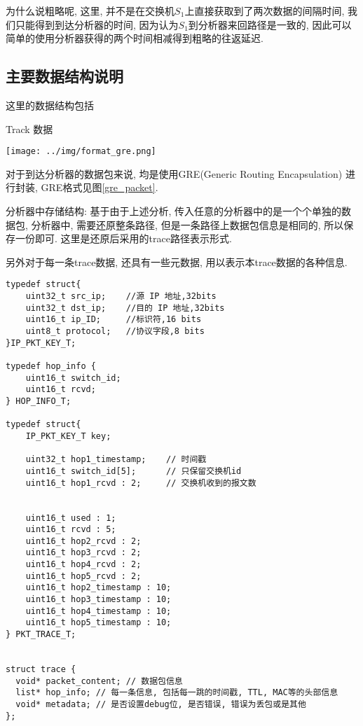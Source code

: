 {\begin{mdframed}[everyline=true]
为什么说粗略呢, 这里,
并不是在交换机\(S_{1}\)上直接获取到了两次数据的间隔时间,
我们只能得到到达分析器的时间, 因为认为\(S_{1}\)到分析器来回路径是一致的,
因此可以 简单的使用分析器获得的两个时间相减得到粗略的往返延迟.

\subsection{主要数据结构说明}

这里的数据结构包括

Track 数据

\begin{center}
\texttt{[image: ../img/format\_gre.png]}
\label{gre_packet}
\end{center}

对于到达分析器的数据包来说, 均是使用GRE(Generic Routing Encapsulation)
进行封装, GRE格式见图\ref{gre_packet}.

分析器中存储结构: 基于由于上述分析,
传入任意的分析器中的是一个个单独的数据包, 分析器中, 需要还原整条路径,
但是一条路径上数据包信息是相同的, 所以保存一份即可.
这里是还原后采用的trace路径表示形式.

另外对于每一条trace数据, 还具有一些元数据,
用以表示本trace数据的各种信息.

\begin{lstlisting}
typedef struct{
    uint32_t src_ip;    //源 IP 地址,32bits
    uint32_t dst_ip;    //目的 IP 地址,32bits
    uint16_t ip_ID;     //标识符,16 bits
    uint8_t protocol;   //协议字段,8 bits
}IP_PKT_KEY_T;

typedef hop_info {
    uint16_t switch_id;
    uint16_t rcvd;
} HOP_INFO_T;

typedef struct{
    IP_PKT_KEY_T key;

    uint32_t hop1_timestamp;    // 时间戳
    uint16_t switch_id[5];      // 只保留交换机id
    uint16_t hop1_rcvd : 2;     // 交换机收到的报文数


    uint16_t used : 1;
    uint16_t rcvd : 5;
    uint16_t hop2_rcvd : 2;
    uint16_t hop3_rcvd : 2;
    uint16_t hop4_rcvd : 2;
    uint16_t hop5_rcvd : 2;
    uint16_t hop2_timestamp : 10;
    uint16_t hop3_timestamp : 10;
    uint16_t hop4_timestamp : 10;
    uint16_t hop5_timestamp : 10;
} PKT_TRACE_T;


struct trace {
  void* packet_content; // 数据包信息
  list* hop_info; // 每一条信息, 包括每一跳的时间戳, TTL, MAC等的头部信息
  void* metadata; // 是否设置debug位, 是否错误, 错误为丢包或是其他
};
\end{lstlisting}


\end{mdframed}}
